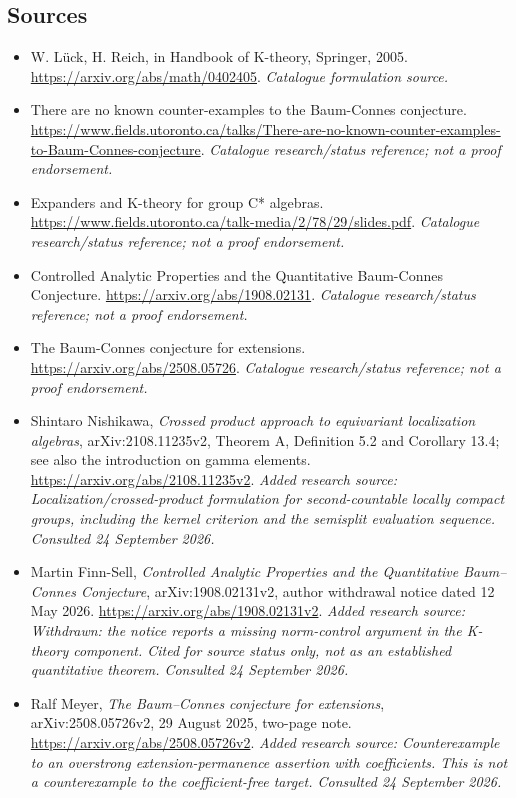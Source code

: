 \documentclass[11pt]{article}
\begin{document}
\subsection{Sources}
\begin{itemize}\raggedright
\item[\textnormal{[S1]}]\hypertarget{source:1479:1}{} W. Lück, H. Reich, in Handbook of K-theory, Springer, 2005.
\url{https://arxiv.org/abs/math/0402405}.
{\small\textit{Catalogue formulation source.}}
\item[\textnormal{[S2]}]\hypertarget{source:1479:2}{} There are no known counter-examples to the Baum-Connes conjecture.
\url{https://www.fields.utoronto.ca/talks/There-are-no-known-counter-examples-to-Baum-Connes-conjecture}.
{\small\textit{Catalogue research/status reference; not a proof endorsement.}}
\item[\textnormal{[S3]}]\hypertarget{source:1479:3}{} Expanders and K-theory for group C* algebras.
\url{https://www.fields.utoronto.ca/talk-media/2/78/29/slides.pdf}.
{\small\textit{Catalogue research/status reference; not a proof endorsement.}}
\item[\textnormal{[S4]}]\hypertarget{source:1479:4}{} Controlled Analytic Properties and the Quantitative Baum-Connes Conjecture.
\url{https://arxiv.org/abs/1908.02131}.
{\small\textit{Catalogue research/status reference; not a proof endorsement.}}
\item[\textnormal{[S5]}]\hypertarget{source:1479:5}{} The Baum-Connes conjecture for extensions.
\url{https://arxiv.org/abs/2508.05726}.
{\small\textit{Catalogue research/status reference; not a proof endorsement.}}
\item[\textnormal{[E1]}]\hypertarget{extra:1479:1}{} Shintaro Nishikawa, \emph{Crossed product approach to equivariant localization algebras}, arXiv:2108.11235v2, Theorem A, Definition 5.2 and Corollary 13.4; see also the introduction on gamma elements.
\url{https://arxiv.org/abs/2108.11235v2}.
{\small\textit{Added research source: Localization/crossed-product formulation for second-countable locally compact groups, including the kernel criterion and the semisplit evaluation sequence. Consulted 24 September 2026.}}
\item[\textnormal{[E2]}]\hypertarget{extra:1479:2}{} Martin Finn-Sell, \emph{Controlled Analytic Properties and the Quantitative Baum--Connes Conjecture}, arXiv:1908.02131v2, author withdrawal notice dated 12 May 2026.
\url{https://arxiv.org/abs/1908.02131v2}.
{\small\textit{Added research source: Withdrawn: the notice reports a missing norm-control argument in the K-theory component. Cited for source status only, not as an established quantitative theorem. Consulted 24 September 2026.}}
\item[\textnormal{[E3]}]\hypertarget{extra:1479:3}{} Ralf Meyer, \emph{The Baum--Connes conjecture for extensions}, arXiv:2508.05726v2, 29 August 2025, two-page note.
\url{https://arxiv.org/abs/2508.05726v2}.
{\small\textit{Added research source: Counterexample to an overstrong extension-permanence assertion with coefficients. This is not a counterexample to the coefficient-free target. Consulted 24 September 2026.}}
\end{itemize}
\end{document}

